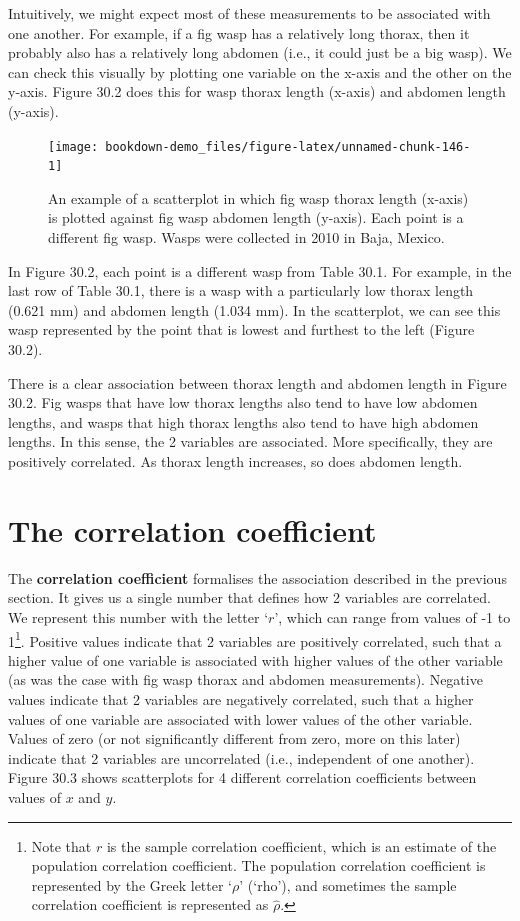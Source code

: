 \documentclass[
]{scrbook}
\begin{document}
Intuitively, we might expect most of these measurements to be associated with one another.
For example, if a fig wasp has a relatively long thorax, then it probably also has a relatively long abdomen (i.e., it could just be a big wasp).
We can check this visually by plotting one variable on the x-axis and the other on the y-axis.
Figure 30.2 does this for wasp thorax length (x-axis) and abdomen length (y-axis).

\begin{figure}
\texttt{[image: bookdown-demo\_files/figure-latex/unnamed-chunk-146-1]} \caption{An example of a scatterplot in which fig wasp thorax length (x-axis) is plotted against fig wasp abdomen length (y-axis). Each point is a different fig wasp. Wasps were collected in 2010 in Baja, Mexico.}\label{fig:unnamed-chunk-146}
\end{figure}

In Figure 30.2, each point is a different wasp from Table 30.1.
For example, in the last row of Table 30.1, there is a wasp with a particularly low thorax length (0.621 mm) and abdomen length (1.034 mm).
In the scatterplot, we can see this wasp represented by the point that is lowest and furthest to the left (Figure 30.2).

There is a clear association between thorax length and abdomen length in Figure 30.2.
Fig wasps that have low thorax lengths also tend to have low abdomen lengths, and wasps that high thorax lengths also tend to have high abdomen lengths.
In this sense, the 2 variables are associated.
More specifically, they are positively correlated.
As thorax length increases, so does abdomen length.

\hypertarget{the-correlation-coefficient}{%
\section{The correlation coefficient}\label{the-correlation-coefficient}}

The \textbf{correlation coefficient} formalises the association described in the previous section.
It gives us a single number that defines how 2 variables are correlated.
We represent this number with the letter `\(r\)', which can range from values of -1 to 1\footnote{Note that \(r\) is the sample correlation coefficient, which is an estimate of the population correlation coefficient. The population correlation coefficient is represented by the Greek letter `\(\rho\)' (`rho'), and sometimes the sample correlation coefficient is represented as \(\hat{\rho}\).}.
Positive values indicate that 2 variables are positively correlated, such that a higher value of one variable is associated with higher values of the other variable (as was the case with fig wasp thorax and abdomen measurements).
Negative values indicate that 2 variables are negatively correlated, such that a higher values of one variable are associated with lower values of the other variable.
Values of zero (or not significantly different from zero, more on this later) indicate that 2 variables are uncorrelated (i.e., independent of one another).
Figure 30.3 shows scatterplots for 4 different correlation coefficients between values of \(x\) and \(y\).
\end{document}
